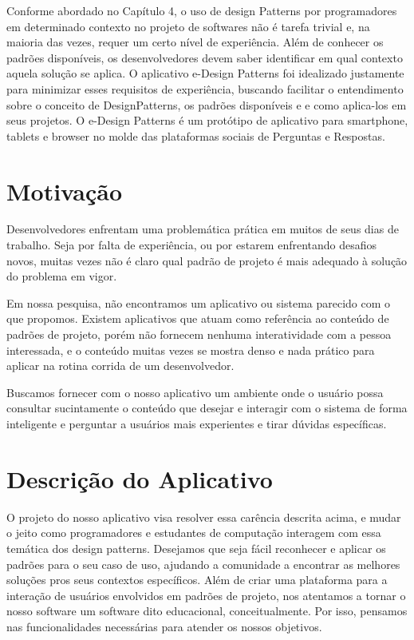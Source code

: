 Conforme abordado no Capítulo 4, o uso de design Patterns por programadores em determinado contexto no projeto de softwares não é tarefa trivial e, na maioria das vezes, requer um certo nível de experiência. Além de conhecer os padrões disponíveis, os desenvolvedores devem saber identificar em qual contexto aquela solução se aplica. O aplicativo e-Design Patterns foi idealizado justamente para minimizar esses requisitos de experiência, buscando facilitar o entendimento sobre o conceito de DesignPatterns, os padrões disponíveis e e como aplica-los em seus projetos. O e-Design Patterns é um protótipo de aplicativo para smartphone, tablets e browser no molde das plataformas sociais de Perguntas e Respostas.

\section{ Motivação}
Desenvolvedores enfrentam uma problemática prática em muitos de seus dias de trabalho. Seja por falta de experiência, ou por estarem enfrentando desafios novos, muitas vezes não é claro qual padrão de projeto é mais adequado à solução do problema em vigor.

Em nossa pesquisa, não encontramos um aplicativo ou sistema parecido com o que propomos. Existem aplicativos que atuam como referência ao conteúdo de padrões de projeto, porém não fornecem nenhuma interatividade com a pessoa interessada, e o conteúdo muitas vezes se mostra denso e nada prático para aplicar na rotina corrida de um desenvolvedor.

Buscamos fornecer com o nosso aplicativo um ambiente onde o usuário possa consultar sucintamente o conteúdo que desejar e interagir com o sistema de forma inteligente e perguntar a usuários mais experientes e tirar dúvidas específicas.

\section{Descrição do Aplicativo}
O projeto do nosso aplicativo visa resolver essa carência descrita acima, e mudar o jeito como programadores e estudantes de computação interagem com essa temática dos design patterns. Desejamos que seja fácil reconhecer e aplicar os padrões para o seu caso de uso, ajudando a comunidade a encontrar as melhores soluções pros seus contextos específicos. Além de criar uma plataforma para a interação de usuários envolvidos em padrões de projeto, nos atentamos a tornar o nosso software um software dito educacional, conceitualmente. Por isso, pensamos nas funcionalidades necessárias para atender os nossos objetivos.

